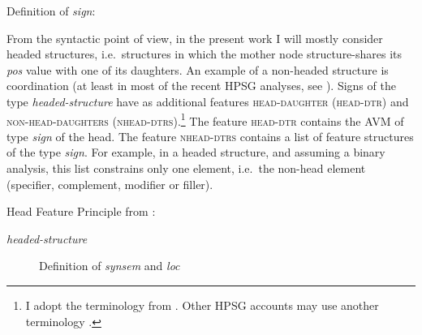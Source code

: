 \ea Definition of \emph{sign}\nopagebreak:

\z 

From the syntactic point of view, in the present work I will mostly consider headed structures, i.e.\ structures in which the mother node structure-shares its \emph{pos} value with one of its daughters. An example of a non-headed structure is coordination (at least in most of the recent HPSG analyses, see \citealt{Abeille.2020.HPSG.Coord}). Signs of the type \emph{headed-structure} have as additional features \textsc{head-daughter (head-dtr)} and \textsc{non-head-daughters (nhead-dtrs)}.\footnote{I adopt the terminology from \citet{Sag.1997}. Other HPSG accounts may use another terminology \citep[e.g., \textsc{daughters} in][Section~2.5]{Ginzburg.2000}.}
The feature \textsc{head-dtr} contains the AVM of type \emph{sign} of the head. The feature \textsc{nhead-dtrs} contains a list of feature structures of the type \emph{sign}. For example, in a headed structure, and assuming a binary analysis, this list constrains only one element, i.e.\ the non-head element (specifier, complement, modifier or filler).\largerpage[2]

\ea Head Feature Principle from \citet[34]{Pollard.1994}: \nopagebreak

\textit{headed-structure} 
\label{avm:head-feature-principle}
\z 

\begin{figure}
    \caption{Definition of \emph{synsem} and \emph{loc}}
    \label{fig:synsem-loc-def}
\end{figure}

